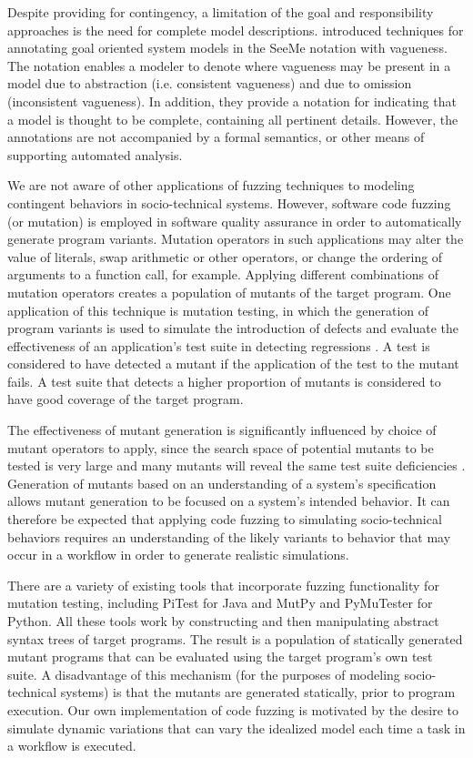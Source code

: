 \documentclass{llncs}
\begin{document}
Despite providing for contingency, a limitation of the goal and responsibility approaches is the need for complete model
descriptions. \citet{herrmann1999vagueness} introduced techniques for annotating goal oriented system models in the SeeMe
notation with vagueness.  The notation enables a modeler to denote where vagueness may be present in a model due to
abstraction (i.e. consistent vagueness) and due to omission (inconsistent vagueness).  In addition, they provide a
notation for indicating that a model is thought to be complete, containing all pertinent details.  However, the
annotations are not accompanied by a formal semantics, or other means of supporting automated analysis.

We are not aware of other applications of fuzzing techniques to modeling contingent behaviors in socio-technical
systems.  However, software code fuzzing (or mutation) is employed in software quality assurance in order to
automatically generate program variants.  Mutation operators in such applications may alter the value of literals, swap
arithmetic or other operators, or change the ordering of arguments to a function call, for example.  Applying different
combinations of mutation operators creates a population of mutants of the target program.  One application of this
technique is mutation testing, in which the generation of program variants is used to simulate the introduction of
defects and evaluate the effectiveness of an application's test suite in detecting regressions \cite{demillo78hints}.  A
test is considered to have detected a mutant if the application of the test to the mutant fails.  A test suite that
detects a higher proportion of mutants is considered to have good coverage of the target program.

The effectiveness of mutant generation is significantly influenced by choice of mutant operators to apply, since the
search space of potential mutants to be tested is very large and many mutants will reveal the same test suite
deficiencies \cite{takanen08fuzzing}.  Generation of mutants based on an understanding of a system's specification allows
mutant generation to be focused on a system's intended behavior.  It can therefore be expected that applying code
fuzzing to simulating socio-technical behaviors requires an understanding of the likely variants to behavior that may
occur in a workflow in order to generate realistic simulations.

There are a variety of existing tools that incorporate fuzzing functionality for mutation testing, including PiTest
\cite{coles14pitest} for Java and MutPy \cite{mutpy26} and PyMuTester \cite{pymuttester} for Python. All these tools
work by constructing and then manipulating abstract syntax trees of target programs.  The result is a population of
statically generated mutant programs that can be evaluated using the target program's own test suite.  A disadvantage of
this mechanism (for the purposes of modeling socio-technical systems) is that the mutants are generated statically,
prior to program execution.  Our own implementation of code fuzzing is motivated by the desire to simulate dynamic
variations that can vary the idealized model each time a task in a workflow is executed.
\end{document}
